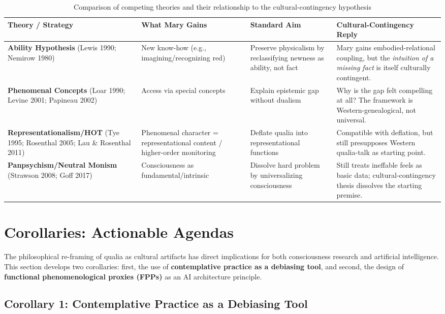 \documentclass[11pt,a4paper]{article}
\begin{document}
\begin{table}[h]
\centering
\begin{tabular}{|p{2.5cm}|p{3cm}|p{3cm}|p{4cm}|}
\hline
\textbf{Theory / Strategy} & \textbf{What Mary Gains} & \textbf{Standard Aim} & \textbf{Cultural-Contingency Reply} \\
\hline
\textbf{Ability Hypothesis} (Lewis 1990; Nemirow 1980) & New know-how (e.g., imagining/recognizing red) & Preserve physicalism by reclassifying newness as ability, not fact & Mary gains embodied-relational coupling, but the \emph{intuition of a missing fact} is itself culturally contingent. \\
\hline
\textbf{Phenomenal Concepts} (Loar 1990; Levine 2001; Papineau 2002) & Access via special concepts & Explain epistemic gap without dualism & Why is the gap felt compelling at all? The framework is Western-genealogical, not universal. \\
\hline
\textbf{Representationalism/HOT} (Tye 1995; Rosenthal 2005; Lau \& Rosenthal 2011) & Phenomenal character = representational content / higher-order monitoring & Deflate qualia into representational functions & Compatible with deflation, but still presupposes Western qualia-talk as starting point. \\
\hline
\textbf{Panpsychism/Neutral Monism} (Strawson 2008; Goff 2017) & Consciousness as fundamental/intrinsic & Dissolve hard problem by universalizing consciousness & Still treats ineffable feels as basic data; cultural-contingency thesis dissolves the starting premise. \\
\hline
\end{tabular}
\caption{Comparison of competing theories and their relationship to the cultural-contingency hypothesis}
\end{table}

\section{Corollaries: Actionable Agendas}

The philosophical re-framing of qualia as cultural artifacts has direct implications for both consciousness research and artificial intelligence. This section develops two corollaries: first, the use of \textbf{contemplative practice as a debiasing tool}, and second, the design of \textbf{functional phenomenological proxies (FPPs)} as an AI architecture principle.

\subsection{Corollary 1: Contemplative Practice as a Debiasing Tool}
\end{document}

